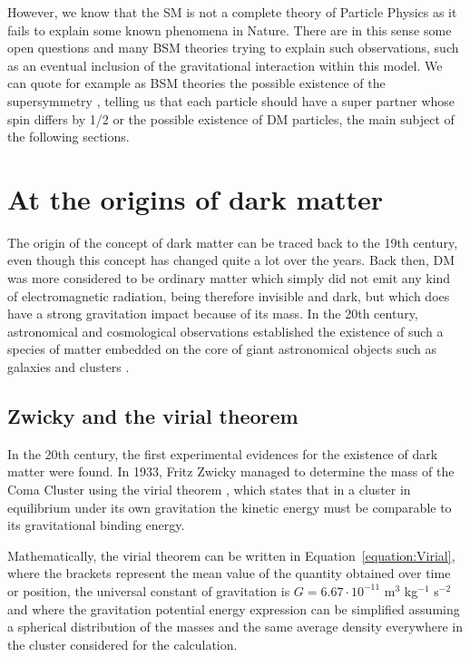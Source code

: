 \documentclass[a4paper, 10pt, openright]{report}
\begin{document}
However, we know that the \ac{SM} is not a complete theory of Particle Physics as it fails to explain some known phenomena in Nature. There are in this sense some open questions and many \ac{BSM} theories trying to explain such observations, such as an eventual inclusion of the gravitational interaction within this model. We can quote for example as \ac{BSM} theories the possible existence of the supersymmetry \cite{SUSY}, telling us that each particle should have a super partner whose spin differs by 1/2 or the possible existence of \ac{DM} particles, the main subject of the following sections.

\section{At the origins of dark matter} \label{section:DMOrigins}

The origin of the concept of dark matter can be traced back to the 19th century, even though this concept has changed quite a lot over the years. Back then, \ac{DM} was more considered to be ordinary matter which simply did not emit any kind of electromagnetic radiation, being therefore invisible and dark, but which does have a strong gravitation impact because of its mass. In the 20th century, astronomical and cosmological observations established the existence of such a species of matter embedded on the core of giant astronomical objects such as galaxies and clusters \cite{Poincare}.

\subsection{Zwicky and the virial theorem}

In the 20th century, the first experimental evidences for the existence of dark matter were found. In 1933, Fritz Zwicky managed to determine the mass of the Coma Cluster using the virial theorem \cite{Zwicky}, which states that in a cluster in equilibrium under its own gravitation the kinetic energy must be comparable to its gravitational binding energy. 

Mathematically, the virial theorem can be written in Equation~\ref{equation:Virial}, where the brackets represent the mean value of the quantity obtained over time or position, the universal constant of gravitation is $G = 6.67 \cdot 10^{-11}$ m$^3$ kg$^{-1}$ s$^{-2}$ and where the gravitation potential energy expression can be simplified assuming a spherical distribution of the masses and the same average density everywhere in the cluster considered for the calculation.
\end{document}
